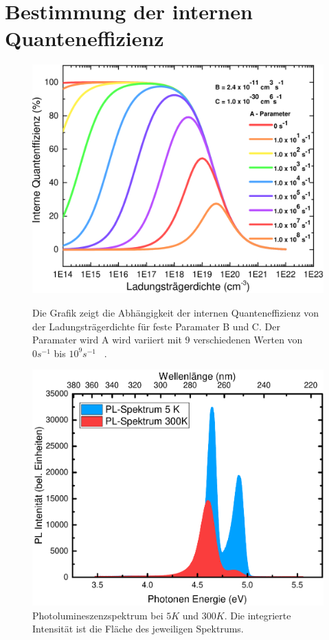 \newpage
\section{Bestimmung der internen Quanteneffizienz}
\thispagestyle{fancy}
\begin{figure}[h]
    \centering
    \begin{minipage}[t]{0.49\linewidth}
        \centering
        \includegraphics[width=\linewidth]{Bilder/IQEohneDotierungVerschAParams.pdf}
        \caption{Die Grafik zeigt die Abhängigkeit der internen Quanteneffizienz von der Ladungsträgerdichte für feste Paramater B und C. Der Paramater wird A wird variiert mit 9 verschiedenen Werten von $0 s^{-1} $ bis $10^9 s^{-1}$ ~\cite{semreich}.}
        \label{fig:abha}
    \end{minipage}
    \hfill
    \begin{minipage}[t]{0.49\linewidth}
        \centering
        \includegraphics[width=\linewidth]{Bilder/BeispielIQEbestimmen.pdf}
        \caption{Photolumineszenzspektrum bei $5K$ und $300K$. Die integrierte Intensität ist die Fläche des jeweiligen Spektrums.}
        \label{fig:beispielint}
    \end{minipage}%
\end{figure}
